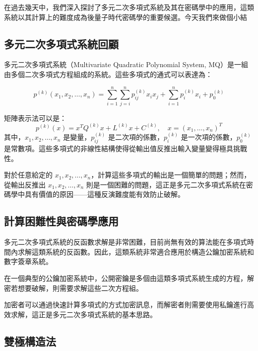 \documentclass[
]{article}
\author{}
\date{}
\begin{document}
在過去幾天中，我們深入探討了多元二次多項式系統及其在密碼學中的應用，這類系統以其計算上的難度成為後量子時代密碼學的重要候選。今天我們來做個小結

\hypertarget{ux591aux5143ux4e8cux6b21ux591aux9805ux5f0fux7cfbux7d71ux56deux9867}{%
\subsection{多元二次多項式系統回顧}\label{ux591aux5143ux4e8cux6b21ux591aux9805ux5f0fux7cfbux7d71ux56deux9867}}

多元二次多項式系統（Multivariate Quadratic Polynomial System,
MQ）是一組由多個二次多項式方程組成的系統。這些多項式的通式可以表達為：

\[
p^{(k)}(x_1, x_2, \ldots, x_n) = \sum_{i=1}^n \sum_{j=i}^n p_{ij}^{(k)} x_i x_j + \sum_{i=1}^n p_i^{(k)} x_i + p_0^{(k)}
\]

矩陣表示法可以是： \[
p^{(k)}(x) = x^T Q^{(k)} x + L^{(k)} x + C^{(k)} ,\quad x = (x_{1},\dots,x_{n})^T
\] 其中，\(x_1, x_2, \ldots, x_n\) 是變量，\(p_{ij}^{(k)}\)
是二次項的係數，\(p_i^{(k)}\) 是一次項的係數，\(p_0^{(k)}\)
是常數項。這些多項式的非線性結構使得從輸出值反推出輸入變量變得極具挑戰性。

對於任意給定的
\(x_1, x_2, \dots, x_n\)，計算這些多項式的輸出是一個簡單的問題；然而，從輸出反推出
\(x_1, x_2, \dots, x_n\)
則是一個困難的問題，這正是多元二次多項式系統在密碼學中具有價值的原因------這種反演難度能有效防止破解。

\hypertarget{ux8a08ux7b97ux56f0ux96e3ux6027ux8207ux5bc6ux78bcux5b78ux61c9ux7528}{%
\subsection{計算困難性與密碼學應用}\label{ux8a08ux7b97ux56f0ux96e3ux6027ux8207ux5bc6ux78bcux5b78ux61c9ux7528}}

多元二次多項式系統的反函數求解是非常困難，目前尚無有效的算法能在多項式時間內求解這類系統的反函數。因此，這類系統非常適合應用於構造公鑰加密系統和數字簽章系統。

在一個典型的公鑰加密系統中，公開密鑰是多個由這類多項式系統生成的方程，解密若想要破解，則需要求解這些二次方程組。

加密者可以通過快速計算多項式的方式加密訊息，而解密者則需要使用私鑰進行高效求解，這正是多元二次多項式系統的基本思路。

\hypertarget{ux96d9ux6975ux69cbux9020ux6cd5}{%
\subsection{雙極構造法}\label{ux96d9ux6975ux69cbux9020ux6cd5}}
\end{document}
